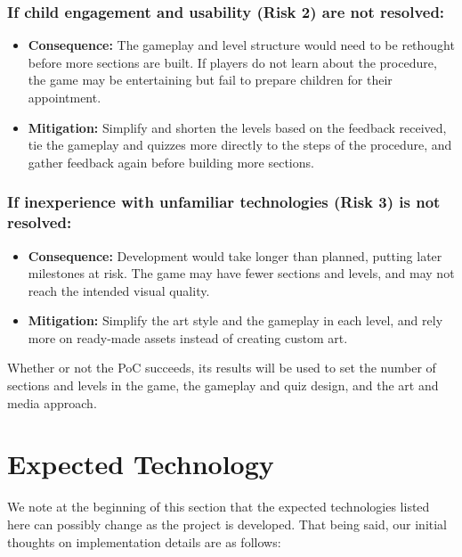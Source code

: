 \documentclass{article}
\begin{document}
\subsubsection*{If child engagement and usability (Risk 2) are not resolved:}
\begin{itemize}
  \item \textbf{Consequence:} The gameplay and level structure would need to be
  rethought before more sections are built. If players do not learn about the
  procedure, the game may be entertaining but fail to prepare children for
  their appointment.
  \item \textbf{Mitigation:} Simplify and shorten the levels based on the
  feedback received, tie the gameplay and quizzes more directly to the steps of
  the procedure, and gather feedback again before building more sections.
\end{itemize}

\subsubsection*{If inexperience with unfamiliar technologies (Risk 3) is not resolved:}
\begin{itemize}
  \item \textbf{Consequence:} Development would take longer than planned, putting
  later milestones at risk. The game may have fewer sections and levels, and may
  not reach the intended visual quality.
  \item \textbf{Mitigation:} Simplify the art style and the gameplay in each
  level, and rely more on ready-made assets instead of creating custom art.
\end{itemize}

\noindent Whether or not the PoC succeeds, its results will be used to set the
number of sections and levels in the game, the gameplay and quiz design, and
the art and media approach.

\section{Expected Technology}

We note at the beginning of this section that the expected technologies listed here can possibly change as the project is
developed. That being said, our initial thoughts on implementation details are as follows:
\end{document}
